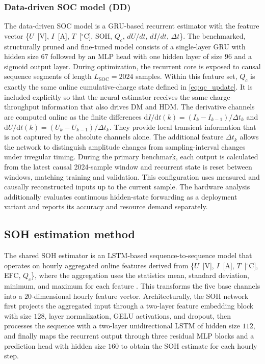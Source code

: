\documentclass[review,nopreprintline]{elsarticle}
\begin{document}
\subsubsection*{Data-driven SOC model (DD)}
The data-driven SOC model is a GRU-based recurrent estimator with the feature vector \{$U$~[V], $I$~[A], $T$~[$^\circ$C], SOH, $Q_c$, $dU/dt$, $dI/dt$, $\Delta t$\}. The benchmarked, structurally pruned and fine-tuned model consists of a single-layer GRU with hidden size $67$ followed by an MLP head with one hidden layer of size $96$ and a sigmoid output layer. During optimization, the recurrent core is exposed to causal sequence segments of length $L_{\mathrm{SOC}}=2024$ samples. Within this feature set, $Q_c$ is exactly the same online cumulative-charge state defined in \eqref{eq:qc_update}. It is included explicitly so that the neural estimator receives the same charge-throughput information that also drives DM and HDM. The derivative channels are computed online as the finite differences $\mathrm{d}I/\mathrm{d}t(k)=(I_k-I_{k-1})/\Delta t_k$ and $\mathrm{d}U/\mathrm{d}t(k)=(U_k-U_{k-1})/\Delta t_k$. They provide local transient information that is not captured by the absolute channels alone. The additional feature $\Delta t_k$ allows the network to distinguish amplitude changes from sampling-interval changes under irregular timing. During the primary benchmark, each output is calculated from the latest causal 2024-sample window and recurrent state is reset between windows, matching training and validation. This configuration uses measured and causally reconstructed inputs up to the current sample. The hardware analysis additionally evaluates continuous hidden-state forwarding as a deployment variant and reports its accuracy and resource demand separately.

\subsection{SOH estimation method}
The shared SOH estimator is an LSTM-based sequence-to-sequence model that operates on hourly aggregated online features derived from \{$U$~[V], $I$~[A], $T$~[$^\circ$C], EFC, $Q_c$\}, where the aggregation uses the statistics mean, standard deviation, minimum, and maximum for each feature \cite{Embedded_AI_SOH_badData,gouEnsembleLearningBasedDataDriven2021,liOnlineCapacityEstimation2021,rzepkaNeuralNetworkArchitecture2023a}. This transforms the five base channels into a $20$-dimensional hourly feature vector. Architecturally, the SOH network first projects the aggregated input through a two-layer feature embedding block with size $128$, layer normalization, GELU activations, and dropout, then processes the sequence with a two-layer unidirectional LSTM of hidden size $112$, and finally maps the recurrent output through three residual MLP blocks and a prediction head with hidden size $160$ to obtain the SOH estimate for each hourly step.
\end{document}
